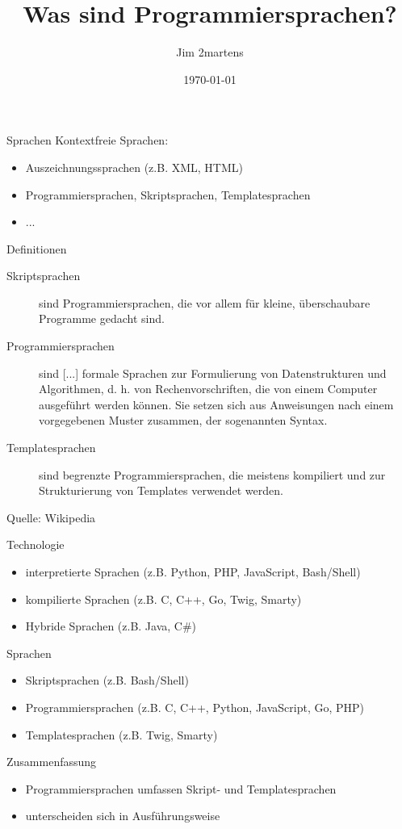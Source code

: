 \documentclass{beamer}
\begin{document}
\author{Jim 2martens}
\title{Was sind Programmiersprachen?}
\date{\today}

\begin{frame}
    \titlepage
\end{frame}

\begin{frame}{Sprachen}
    Kontextfreie Sprachen:
    \begin{itemize}
        \item<2-> Auszeichnungssprachen (z.B. XML, HTML)
        \item<3-> Programmiersprachen, Skriptsprachen, Templatesprachen
        \item<4-> ...
    \end{itemize}
\end{frame}

\begin{frame}{Definitionen}
    \begin{description}
        \item[Skriptsprachen] sind Programmiersprachen, die vor allem für kleine, überschaubare Programme gedacht sind.
        \item[Programmiersprachen] sind [...] formale Sprachen zur Formulierung von Datenstrukturen und Algorithmen, d. h. von Rechenvorschriften, die von einem Computer ausgeführt werden können. Sie setzen sich aus Anweisungen nach einem vorgegebenen Muster zusammen, der sogenannten Syntax.
        \item[Templatesprachen] sind begrenzte Programmiersprachen, die meistens kompiliert und zur Strukturierung von Templates verwendet werden.
    \end{description}

    Quelle: Wikipedia
\end{frame}

\begin{frame}{Technologie}
    \begin{itemize}
        \item interpretierte Sprachen (z.B. Python, PHP, JavaScript, Bash/Shell)
        \item kompilierte Sprachen (z.B. C, C++, Go, Twig, Smarty)
        \item Hybride Sprachen (z.B. Java, C#)
    \end{itemize}
\end{frame}

\begin{frame}{Sprachen}
    \begin{itemize}
        \item Skriptsprachen (z.B. Bash/Shell)
        \item Programmiersprachen (z.B. C, C++, Python, JavaScript, Go, PHP)
        \item Templatesprachen (z.B. Twig, Smarty)
    \end{itemize}
\end{frame}

\begin{frame}{Zusammenfassung}
    \begin{itemize}
        \item Programmiersprachen umfassen Skript- und Templatesprachen
        \item unterscheiden sich in Ausführungsweise
    \end{itemize}
\end{frame}
\end{document}
